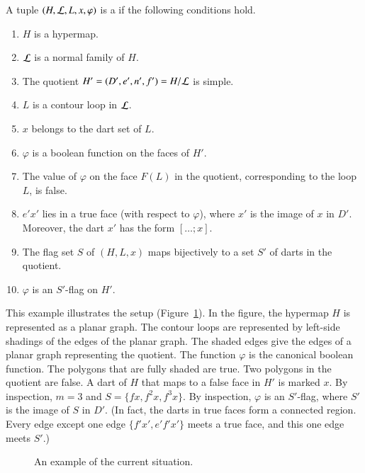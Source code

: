 \begin{definition}\label{def:marked}
  A tuple $(H,{\cal L},L,x,\varphi)$ is a  if
  the following conditions hold.
\begin{enumerate}
\item $H$ is a hypermap.
\item $\cal L$ is a normal family of $H$.
\item The quotient $H'=(D',e',n',f')=H/{\cal L}$ is simple.  
\item $L$ is a contour loop in ${\cal L}$.
\item $x$ belongs to the dart set of $L$.
\item $\varphi$ is a boolean function on the faces of $H'$.
\item The value of $\varphi$ on the face $F(L)$
in the quotient, corresponding to the loop $L$, is false.
\item   $e'x'$ lies in
a true face (with respect to $\varphi$), where $x'$ is the image
of $x$ in $D'$. Moreover, the dart $x'$ has the form $[\ldots;x]$.
\item The flag set $S$ of $(H,L,x)$ maps bijectively to a set $S'$
of darts in the quotient.
\item  $\varphi$ is an $S'$-flag on $H'$.
\end{enumerate}
\end{definition}




\begin{example}\label{ex:graph-gen}  
  This example illustrates the setup (Figure~\ref{fig:graph-gen}).  In
  the figure, the hypermap $H$ is represented as a planar graph.  The
  contour loops are represented by left-side shadings of the edges of
  the planar graph.  The shaded edges give the edges of a planar graph
  representing the quotient.  The function $\varphi$ is the canonical
  boolean function.  The polygons that are fully shaded are true.  Two
  polygons in the quotient are false.  A dart of $H$ that maps to a
  false face in $H'$ is marked $x$.  By inspection, $m=3$ and $S=\{f
  x,f^2 x,f^3 x\}$.  By inspection, $\varphi$ is an $S'$-flag, where
  $S'$ is the image of $S$ in $D'$.  (In fact, the darts in true faces
  form a connected region.  Every edge except one edge $\{f' x', e' f'
  x'\}$ meets a true face, and this one edge meets $S'$.)
\end{example}

\begin{figure}[htb]
\centering
{}
\caption{An example of the current situation.}
\label{fig:graph-gen}
\end{figure}



